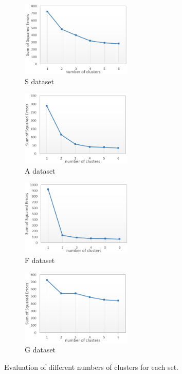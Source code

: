 \begin{figure}[ht]
	\centering
	\begin{subfigure}[b]{0.4\linewidth}
		\centering
		\includegraphics[width=150pt]{figures/Scluster_new4.png}
		\caption{S dataset}
		\label{fig:iosS}
	\end{subfigure}
	\begin{subfigure}[b]{0.4\linewidth}
		\centering
		\includegraphics[width=150pt]{figures/Acluster_new4.png}
		\caption{A dataset}
		\label{fig:androidS}
	\end{subfigure}
	\begin{subfigure}[b]{0.4\linewidth}
		\centering
		\includegraphics[width=150pt]{figures/Fcluster_new4.png}
		\caption{F dataset}
		\label{fig:fitbitA}
	\end{subfigure}
	\begin{subfigure}[b]{0.4\linewidth}
		\centering
		\includegraphics[width=150pt]{figures/Gcluster_new4.png}
		\caption{G dataset}
		\label{fig:fitbitA}
	\end{subfigure}
	\caption{Evaluation of different numbers of clusters for each set.}
	\label{fig:cluster_evaluation}
\end{figure}




